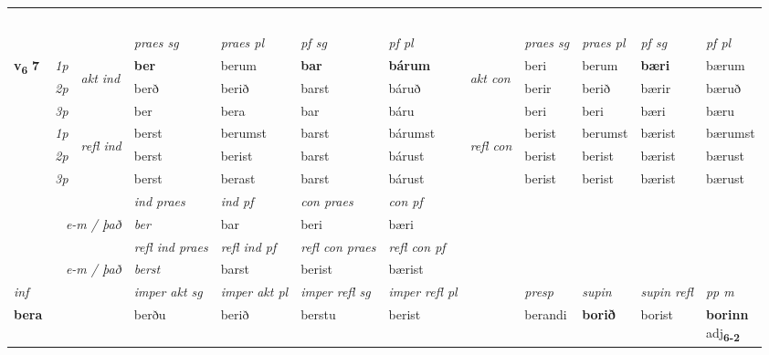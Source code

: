 \begin{longtable}[l]{X>{\footnotesize\itshape}llXXXXlXXXX}
\midrule
  & \\*
   & \\*
     & \\*
   & \\*
  & \\
   \midrule
 & &   & \textit{praes sg}  & \textit{praes pl}    & \textit{ pf sg} & \textit{pf pl} & & \textit{praes sg}  & \textit{praes pl}    & \textit{pf sg} & \textit{pf pl }  \\ \cmidrule{4-7} \cmidrule{9-12}
 \multirow{2}{*}{{{\textbf{v{\textsubscript{6}}} \Large{\textbf{7}}}}}  & 1p & \multirow{3}{*}{\begin{turn}{90}\textit{akt ind}\end{turn}} & \textbf{ber} & berum & \textbf{bar} & \textbf{bárum} & \multirow{3}{*}{\begin{turn}{90}\textit{akt con}\end{turn}} &beri & berum & \textbf{bæri} & bærum\\*
 & 2p &  &  berð  & berið & barst & báruð & & berir & berið & bærir & bæruð \\*
 & 3p &  & ber & bera & bar & báru & & beri & beri& bæri & bæru \\*
\cmidrule{4-7} \cmidrule{9-12}
 & 1p & \multirow{3}{*}{\begin{turn}{90}\textit{refl ind}\end{turn}}  & berst & berumst & barst & bárumst & \multirow{3}{*}{\begin{turn}{90}\textit{refl con}\end{turn}}  &berist & berumst & bærist & bærumst \\*
 & 2p &  & berst & berist & barst & bárust & &berist & berist & bærist & bærust \\*
 & 3p  & & berst & berast & barst & bárust & & berist & berist& bærist & bærust \\*
\cmidrule{4-7} \cmidrule{9-12}

   && &  \textit{ind praes} & \textit{ind pf} & \textit{con praes} & \textit{con pf} \\*
\multicolumn{3}{r}{\textit{e-m / það}} & ber & bar & beri & bæri \\*

\cmidrule{4-7}
 & && \textit{refl ind praes} & \textit{refl ind pf} & \textit{refl con praes} & \textit{refl con pf} \\*
\multicolumn{3}{r}{\textit{e-m / það}}& berst & barst & berist & bærist \\*

\cmidrule{4-7}
   {\textit{inf}} & &  & \textit{imper akt sg} & \textit{imper akt pl} & \textit{imper refl sg} & \textit{imper refl pl} && \textit{presp} & \textit{supin} & \textit{supin refl} & \textit{pp m} \\*
  {\textbf{bera}} & && berðu  & berið & berstu & berist && berandi &  \textbf{borið} & borist & \specialcell{\textbf{borinn} \\ adj\textbf{\textsubscript{6-2}}} \\*


\end{longtable}

